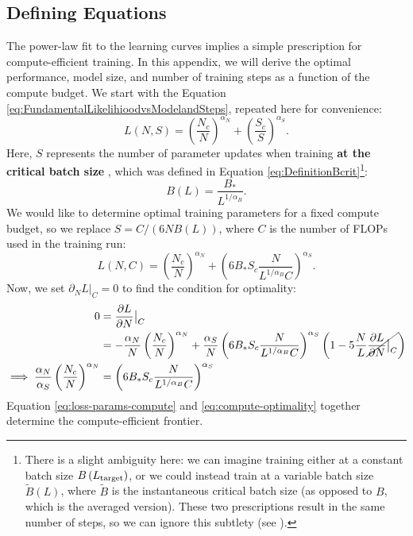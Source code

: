 \documentclass[english]{article}
\begin{document}
\subsection{Defining Equations}
The power-law fit to the learning curves implies a simple prescription for compute-efficient training.
In this appendix, we will derive the optimal performance, model size, and number of training steps as a function of the compute budget.
We start with the Equation \eqref{eq:FundamentalLikelihioodvsModelandSteps}, repeated here for convenience:
\begin{equation}
L\left(N,S\right)=\left(\frac{N_{c}}{N}\right)^{\alpha_{N}}+\left(\frac{S_{c}}{S}\right)^{\alpha_{S}}.
\end{equation}
Here, $S$ represents the number of parameter updates when training \textbf{at the critical batch size} \cite{1812.06162}, which was defined in Equation \eqref{eq:DefinitionBcrit}\footnote{There is a slight ambiguity here: we can imagine training either at a constant batch size $B\left(L_{{\rm target}}\right)$, or we could instead train at a variable batch size $\tilde{B}\left(L\right)$, where $\tilde{B}$ is the instantaneous critical batch size (as opposed to $B$, which is the averaged version). These two prescriptions result in the same number of steps, so we can ignore this subtlety (see \cite{1812.06162}).}:
\begin{equation}
B\left(L\right)=\frac{B_{\ast}}{L^{1/\alpha_{B}}}.
\end{equation}
We would like to determine optimal training parameters for a fixed compute budget, so we replace $S=C/\left(6NB\left(L\right)\right)$, where $C$ is the number of FLOPs used in the training run:
\begin{equation}
L\left(N,C\right)=\left(\frac{N_{c}}{N}\right)^{\alpha_{N}}+\left(6B_{\ast}S_{c}\frac{N}{L^{1/\alpha_{B}}C}\right)^{\alpha_{S}}.\label{eq:loss-params-compute}
\end{equation}
Now, we set $\partial_{N}L\big|_{C}=0$ to find the condition for optimality:
\begin{align}
0 & =\frac{\partial L}{\partial N}\big|_{C}\nonumber \\
 & =-\frac{\alpha_{N}}{N}\left(\frac{N_{c}}{N}\right)^{\alpha_{N}}+\frac{\alpha_{S}}{N}\left(6B_{\ast}S_{c}\frac{N}{L^{1/\alpha_{B}}C}\right)^{\alpha_{S}}\left(1-5\frac{N}{L}\cancel{\frac{\partial L}{\partial N}\big|_{C}}\right)\nonumber \\
\implies\frac{\alpha_{N}}{\alpha_{S}}\left(\frac{N_{c}}{N}\right)^{\alpha_{N}} & =\left(6B_{\ast}S_{c}\frac{N}{L^{1/\alpha_{B}}C}\right)^{\alpha_{S}}\label{eq:compute-optimality}
\end{align}
Equation \eqref{eq:loss-params-compute} and \eqref{eq:compute-optimality} together determine the compute-efficient frontier.
\end{document}
